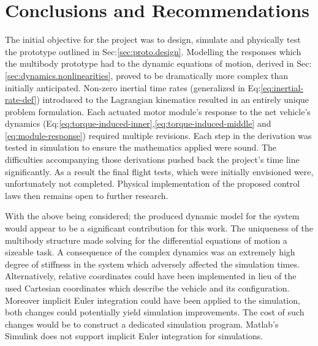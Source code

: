 \chapter{Conclusions and Recommendations}
\label{ch:conclusion}
The initial objective for the project was to design, simulate and physically test the prototype outlined in Sec:\ref{sec:proto.design}. Modelling the responses which the multibody prototype had to the dynamic equations of motion, derived in Sec:\ref{sec:dynamics.nonlinearities}, proved to be dramatically more complex than initially anticipated. 
Non-zero inertial time rates (generalized in Eq:\ref{eq:inertial-rate-def}) introduced to the Lagrangian kinematics resulted in an entirely unique problem formulation. Each actuated motor module's response to the net vehicle's dynamics (Eq:\ref{eq:torque-induced-inner},\ref{eq:torque-induced-middle} and \ref{eq:module-response}) required multiple revisions. Each step in the derivation was tested in simulation to ensure the mathematics applied were sound. The difficulties accompanying those derivations pushed back the project's time line significantly. As a result the final flight tests, which were initially envisioned were, unfortunately not completed. Physical implementation of the proposed control laws then remains open to further research.
\par
With the above being considered; the produced dynamic model for the system would appear to be a significant contribution for this work. The uniqueness of the multibody structure made solving for the differential equations of motion a sizeable task. A consequence of the complex dynamics was an extremely high degree of stiffness in the system which adversely affected the simulation times. Alternatively, relative coordinates could have been implemented in lieu of the used Cartesian coordinates which describe the vehicle and its configuration. Moreover implicit Euler integration could have been applied to the simulation, both changes could potentially yield simulation improvements. The cost of such changes would be to construct a dedicated simulation program. Matlab's Simulink does not support implicit Euler integration for simulations.
\par
